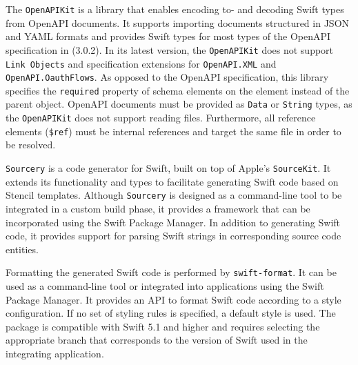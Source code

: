 The \texttt{OpenAPIKit} is a library that enables encoding to- and decoding Swift types from OpenAPI documents. It supports importing documents structured in JSON and YAML formats and provides Swift types for most types of the OpenAPI specification in (3.0.2). In its latest version, the \texttt{OpenAPIKit} does not support \texttt{Link Objects} and specification extensions for \texttt{OpenAPI.XML} and \texttt{OpenAPI.Oauth\-Flows}. As opposed to the OpenAPI specification, this library specifies the \texttt{re\-qui\-red} property of schema elements on the element instead of the parent object. OpenAPI documents must be provided as \texttt{Data} or \texttt{String} types, as the \texttt{OpenAPIKit} does not support reading files. Furthermore, all reference elements (\texttt{\$ref}) must be internal references and target the same file in order to be resolved.

\texttt{Sourcery} is a code generator for Swift, built on top of Apple's \texttt{SourceKit}. It extends its functionality and types to facilitate generating Swift code based on Stencil templates. Although \texttt{Sourcery} is designed as a command-line tool to be integrated in a custom build phase, it provides a framework that can be incorporated using the Swift Package Manager. In addition to generating Swift code, it provides support for parsing Swift strings in corresponding source code entities. 

Formatting the generated Swift code is performed by \texttt{swift-format}. It can be used as a command-line tool or integrated into applications using the Swift Package Manager. It provides an API to format Swift code according to a style configuration. If no set of styling rules is specified, a default style is used. The package is compatible with Swift 5.1 and higher and requires selecting the appropriate branch that corresponds to the version of Swift used in the integrating application.






